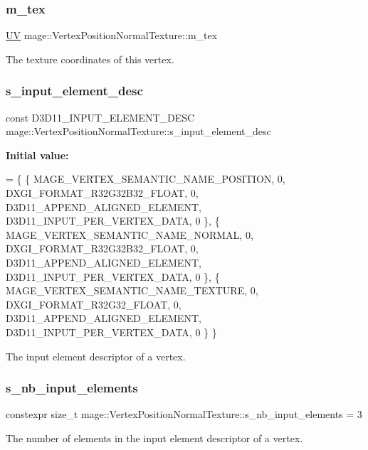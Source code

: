 \subsubsection{\texorpdfstring{m\+\_\+tex}{m\_tex}}
{\footnotesize\ttfamily \hyperlink{structmage_1_1_u_v}{UV} mage\+::\+Vertex\+Position\+Normal\+Texture\+::m\+\_\+tex}

The texture coordinates of this vertex. \hypertarget{structmage_1_1_vertex_position_normal_texture_a52500b6efc9c9e1a4c81eb86673770cf}{}\label{structmage_1_1_vertex_position_normal_texture_a52500b6efc9c9e1a4c81eb86673770cf} 
\subsubsection{\texorpdfstring{s\+\_\+input\+\_\+element\+\_\+desc}{s\_input\_element\_desc}}
{\footnotesize\ttfamily const D3\+D11\+\_\+\+I\+N\+P\+U\+T\+\_\+\+E\+L\+E\+M\+E\+N\+T\+\_\+\+D\+E\+SC mage\+::\+Vertex\+Position\+Normal\+Texture\+::s\+\_\+input\+\_\+element\+\_\+desc\hspace{0.3cm}{\ttfamily [static]}}

{\bfseries Initial value\+:}
\begin{DoxyCode}
= \{
        \{ MAGE\_VERTEX\_SEMANTIC\_NAME\_POSITION, 0, DXGI\_FORMAT\_R32G32B32\_FLOAT,    0, 
      D3D11\_APPEND\_ALIGNED\_ELEMENT, D3D11\_INPUT\_PER\_VERTEX\_DATA, 0 \},
        \{ MAGE\_VERTEX\_SEMANTIC\_NAME\_NORMAL,   0, DXGI\_FORMAT\_R32G32B32\_FLOAT,    0, 
      D3D11\_APPEND\_ALIGNED\_ELEMENT, D3D11\_INPUT\_PER\_VERTEX\_DATA, 0 \},
        \{ MAGE\_VERTEX\_SEMANTIC\_NAME\_TEXTURE,  0, DXGI\_FORMAT\_R32G32\_FLOAT,       0, 
      D3D11\_APPEND\_ALIGNED\_ELEMENT, D3D11\_INPUT\_PER\_VERTEX\_DATA, 0 \}
    \}
\end{DoxyCode}
The input element descriptor of a vertex. \hypertarget{structmage_1_1_vertex_position_normal_texture_a0bde36712236569de4bca8308fd7a284}{}\label{structmage_1_1_vertex_position_normal_texture_a0bde36712236569de4bca8308fd7a284} 
\subsubsection{\texorpdfstring{s\+\_\+nb\+\_\+input\+\_\+elements}{s\_nb\_input\_elements}}
{\footnotesize\ttfamily constexpr size\+\_\+t mage\+::\+Vertex\+Position\+Normal\+Texture\+::s\+\_\+nb\+\_\+input\+\_\+elements = 3\hspace{0.3cm}{\ttfamily [static]}}

The number of elements in the input element descriptor of a vertex. 